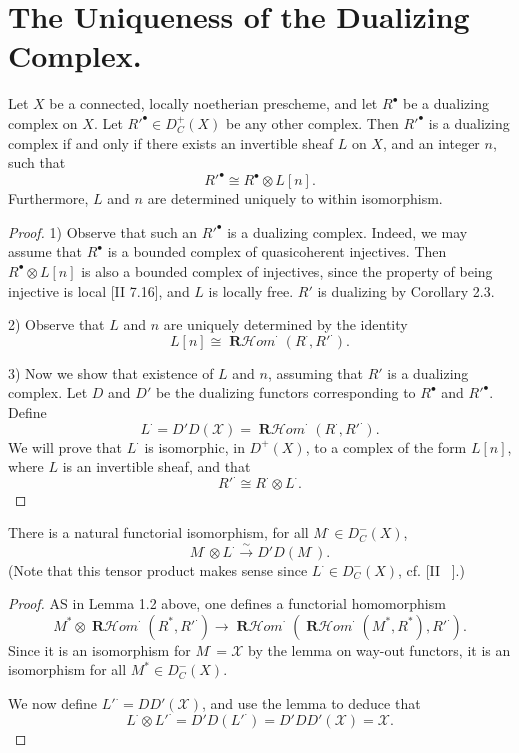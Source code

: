 \documentclass[12pt]{book}
\newcommand{\sheaf}[1]{\mathcal{#1}}
\DeclareMathOperator{\RHom}{\mathbf{R}\mathcal{H}\textit{om}}
\begin{document}
\setcounter{page}{266}
\section{The Uniqueness of the Dualizing Complex.}

\begin{theorem}
Let \(X\) be a connected, locally noetherian prescheme, and let \(R^{\bullet}\) be a dualizing complex on \(X\).
Let \(R'^{\bullet} \in D_{C}^{+}(X)\) be any other complex.
Then \(R'^{\bullet}\) is a dualizing complex if and only if there exists an invertible sheaf \(L\) on \(X\), and an integer \(n\), such that
\[
R'^{\bullet} \cong R^{\bullet} \otimes L[n] .
\]
Furthermore, \(L\) and \(n\) are determined uniquely to within isomorphism.
\end{theorem}

\begin{proof}
1) Observe that such an \(R'^{\bullet}\) is a dualizing complex. Indeed, we may assume that \(R^{\bullet}\) is a bounded complex of quasicoherent injectives. Then \(R^{\bullet} \otimes L[n]\) is also a bounded complex of injectives, since the property of being injective is local [II 7.16], and \(L\) is locally free. \(R'\) is dualizing by Corollary 2.3.

2) Observe that \(L\) and \(n\) are uniquely determined by the identity
\[
L[n] \cong \RHom^{\cdot}(R^{\cdot}, R'^{\cdot}) .
\]

\setcounter{page}{267}
3) Now we show that existence of \(L\) and \(n\), assuming that \(R'\) is a dualizing complex.
Let \(D\) and \(D'\) be the dualizing functors corresponding to \(R^{\bullet}\) and \(R'^{\bullet}\).
Define
\[
L^{\cdot}=D' D(\sheaf{X})=\RHom^{\cdot}(R^{\cdot}, R'^{\cdot}) .
\]
We will prove that \(L^{\cdot}\) is isomorphic, in \(D^{+}(X)\), to a complex of the form \(L[n]\), where \(L\) is an invertible sheaf, and that
\[
R'^{\cdot} \cong R^{\cdot} \otimes L^{\cdot}.
\]
\end{proof}

\begin{lemma}
There is a natural functorial isomorphism, for all \(M^{\cdot} \in D_{C}^{-}(X)\),
\[
M^{\cdot} \otimes L^{\cdot} \stackrel{\sim}{\to} D' D\left(M^{\cdot}\right) .
\]
(Note that this tensor product makes sense since \(L^{\cdot} \in D_{C}^{-}(X)\), cf. [II ~].)
\end{lemma}

\begin{proof}
AS in Lemma 1.2 above, one defines a functorial homomorphism
\[
M^{*} \otimes \RHom^{\cdot}\left(R^{*}, R'^{\cdot}\right)
\to \RHom^{\cdot}\left(\RHom^{\cdot}\left(M^{*}, R^{*}\right), R'^{\cdot}\right) .
\]
Since it is an isomorphism for \(M^{\cdot}=\sheaf{X}\) by the lemma on way-out functors, it is an isomorphism for all \(M^{*} \in D_{C}^{-}(X)\).

\setcounter{page}{268}
We now define \(L'^{\cdot}=DD'(\sheaf{X})\), and use the lemma to deduce that
\[
L^{\cdot} \otimes L'^{\cdot}=D' D\left(L'^{\cdot}\right)=D' D D'\left(\sheaf{X}\right)=\sheaf{X} .
\]
\end{proof}
\end{document}
